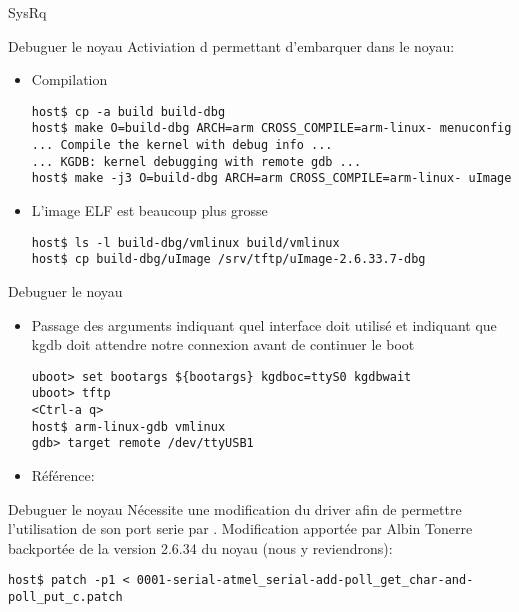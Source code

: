 \begin{frame}[fragile=singleslide]{SysRq}
\end{frame}  


\begin{frame}[fragile=singleslide]{Debuguer le noyau}
  Activiation d  permettant d'embarquer  dans
  le noyau:
  \begin{itemize}
  \item Compilation
    \begin{lstlisting}
host$ cp -a build build-dbg
host$ make O=build-dbg ARCH=arm CROSS_COMPILE=arm-linux- menuconfig
... Compile the kernel with debug info ...
... KGDB: kernel debugging with remote gdb ...
host$ make -j3 O=build-dbg ARCH=arm CROSS_COMPILE=arm-linux- uImage
    \end{lstlisting} 
  \item L'image ELF est beaucoup plus grosse
    \begin{lstlisting}
host$ ls -l build-dbg/vmlinux build/vmlinux
host$ cp build-dbg/uImage /srv/tftp/uImage-2.6.33.7-dbg
    \end{lstlisting} 
  \end{itemize}
\end{frame}
\begin{frame}[fragile=singleslide]{Debuguer le noyau}
  \begin{itemize}
  \item  Passage des arguments   indiquant  quel interface
     doit utilisé et   indiquant que kgdb doit
    attendre notre connexion avant de continuer le boot
    \begin{lstlisting}
uboot> set bootargs ${bootargs} kgdboc=ttyS0 kgdbwait
uboot> tftp
<Ctrl-a q>
host$ arm-linux-gdb vmlinux 
gdb> target remote /dev/ttyUSB1
    \end{lstlisting} 
    \item Référence: 
  \end{itemize}
\end{frame}

\begin{frame}[fragile=singleslide]{Debuguer le noyau}
  Nécessite  une modification  du driver    afin de
  permettre   l'utilisation  de   son  port   serie   par  .
  Modification  apportée par  Albin Tonerre  backportée de  la version
  2.6.34 du noyau (nous y reviendrons):
  \begin{lstlisting}
host$ patch -p1 < 0001-serial-atmel_serial-add-poll_get_char-and-poll_put_c.patch 
  \end{lstlisting} 

\end{frame}

